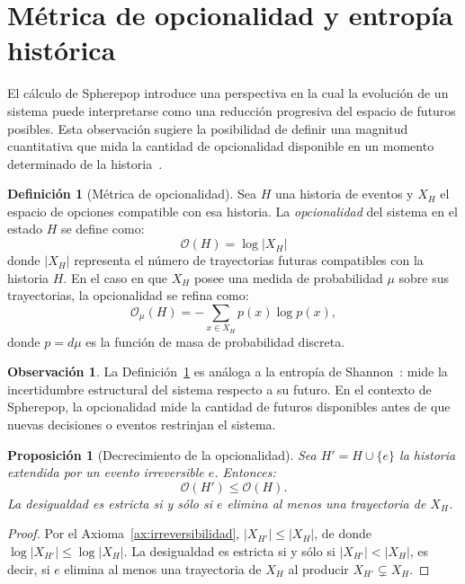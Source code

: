 \documentclass[12pt]{article}
\theoremstyle{plain}
\newtheorem{proposition}[theorem]{Proposición}
\theoremstyle{definition}
\newtheorem{definition}[theorem]{Definición}
\newtheorem{remark}[theorem]{Observación}
\begin{document}
\section{Métrica de opcionalidad y entropía histórica}
\label{sec:opcionalidad}

El cálculo de Spherepop introduce una perspectiva en la cual la evolución de un sistema puede interpretarse como una reducción progresiva del espacio de futuros posibles. Esta observación sugiere la posibilidad de definir una magnitud cuantitativa que mida la cantidad de opcionalidad disponible en un momento determinado de la historia~\cite{landauer,bennett,shannon}.

\begin{definition}[Métrica de opcionalidad]
\label{def:opcionalidad}
Sea $H$ una historia de eventos y $X_H$ el espacio de opciones compatible con esa historia. La \emph{opcionalidad} del sistema en el estado $H$ se define como:
\[
\mathcal{O}(H) = \log |X_H|
\]
donde $|X_H|$ representa el número de trayectorias futuras compatibles con la historia $H$. En el caso en que $X_H$ posee una medida de probabilidad $\mu$ sobre sus trayectorias, la opcionalidad se refina como:
\[
\mathcal{O}_\mu(H) = -\sum_{x \in X_H} p(x) \log p(x),
\]
donde $p = d\mu$ es la función de masa de probabilidad discreta.
\end{definition}

\begin{remark}
La Definición~\ref{def:opcionalidad} es análoga a la entropía de Shannon~\cite{shannon}: mide la incertidumbre estructural del sistema respecto a su futuro. En el contexto de Spherepop, la opcionalidad mide la cantidad de futuros disponibles antes de que nuevas decisiones o eventos restrinjan el sistema.
\end{remark}

\begin{proposition}[Decrecimiento de la opcionalidad]
\label{prop:decrecimiento}
Sea $H' = H \cup \{e\}$ la historia extendida por un evento irreversible $e$. Entonces:
\[
\mathcal{O}(H') \leq \mathcal{O}(H).
\]
La desigualdad es estricta si y sólo si $e$ elimina al menos una trayectoria de $X_H$.
\end{proposition}

\begin{proof}
Por el Axioma~\ref{ax:irreversibilidad}, $|X_{H'}| \leq |X_H|$, de donde $\log|X_{H'}| \leq \log|X_H|$. La desigualdad es estricta si y sólo si $|X_{H'}| < |X_H|$, es decir, si $e$ elimina al menos una trayectoria de $X_H$ al producir $X_{H'} \subsetneq X_H$.
\end{proof}
\end{document}
